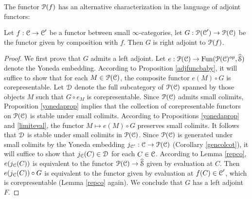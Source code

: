 The functor $\operatorname{\mathcal{P}}(f)$ has an alternative characterization in the language of adjoint functors:

\begin{proposition}\label{adjobs}
Let $f: \operatorname{\mathcal{C}} \rightarrow \operatorname{\mathcal{C}}'$ be a functor between small $\infty$-categories, let
$G: \operatorname{\mathcal{P}}(\operatorname{\mathcal{C}}') \rightarrow \operatorname{\mathcal{P}}(\operatorname{\mathcal{C}})$ be the functor given by composition with $f$.
Then $G$ is right adjoint to $\operatorname{\mathcal{P}}(f)$.
\end{proposition}

\begin{proof}
We first prove that $G$ admits a left adjoint. Let $e: \operatorname{\mathcal{P}}(\operatorname{\mathcal{C}}) \rightarrow \operatorname{Fun}( \operatorname{\mathcal{P}}(\operatorname{\mathcal{C}})^{op}, \widehat{\operatorname{\mathcal{S}}})$ denote the Yoneda embedding.
According to Proposition \ref{adjfuncbaby}, it will suffice to show that for each
$M \in \operatorname{\mathcal{P}}(\operatorname{\mathcal{C}})$, the composite functor $e(M) \circ G$ is corepresentable.
Let $\operatorname{\mathcal{D}}$ denote the full subcategory of $\operatorname{\mathcal{P}}(\operatorname{\mathcal{C}})$ spanned by those objects $M$ such that $G \circ e_M$ is corepresentable. Since $\operatorname{\mathcal{P}}(\operatorname{\mathcal{C}})$ admits small colimits, Proposition \ref{yonedaprop}
implies that the collection of corepresentable functors on $\operatorname{\mathcal{P}}(\operatorname{\mathcal{C}})$ is stable under small colimits. According to Propositions \ref{yonedaprop} and \ref{limiteval}, the functor
$M \mapsto e(M) \circ G$ preserves small colimits. It follows that $\operatorname{\mathcal{D}}$ is stable under small colimits in $\operatorname{\mathcal{P}}(\operatorname{\mathcal{C}})$. Since $\operatorname{\mathcal{P}}(\operatorname{\mathcal{C}})$ is generated under small colimits by the Yoneda embedding $j_{\operatorname{\mathcal{C}}'}: \operatorname{\mathcal{C}} \rightarrow \operatorname{\mathcal{P}}(\operatorname{\mathcal{C}})$ (Corollary \ref{gencolcot}), it will suffice to show that $j_{\operatorname{\mathcal{C}}}(C) \in \operatorname{\mathcal{D}}$ for each $C \in \operatorname{\mathcal{C}}$. According to 
Lemma \ref{repco}, $e(j_{\operatorname{\mathcal{C}}}(C))$ is equivalent to the functor $\operatorname{\mathcal{P}}(\operatorname{\mathcal{C}}) \rightarrow \widehat{\operatorname{\mathcal{S}}}$ given by evaluation at $C$. Then $e( j_{\operatorname{\mathcal{C}}}(C) ) \circ G$ is equivalent to the functor given by evaluation at $f(C) \in \operatorname{\mathcal{C}}'$, which is corepresentable (Lemma \ref{repco} again).
We conclude that $G$ has a left adjoint $F$.


\end{proof}
